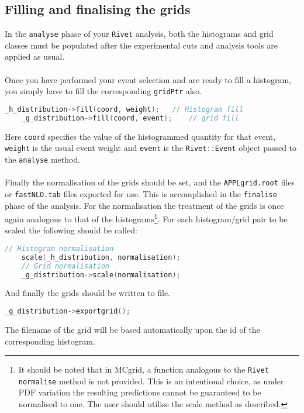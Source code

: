 \documentclass[11pt]{article}
\newcommand{\rivet} {{\tt Rivet}\xspace}
\newcommand{\appl} {{\tt APPLgrid}\xspace}
\newcommand{\fnlo} {{\tt fastNLO}\xspace}
\begin{document}
\subsection{Filling and finalising the grids}
In the \lstinline[language=c++]{analyse} phase of your \rivet analysis, both the histograms and grid classes must be populated after the experimental cuts and analysis tools are applied as usual.\\\\
Once you have performed your event selection and are ready to fill a histogram, you simply have to fill the corresponding \lstinline[language=c++]{gridPtr} also. 
   \begin{lstlisting}[language=c++]
	_h_distribution->fill(coord, weight);	// Histogram fill  
	_g_distribution->fill(coord, event);	// grid fill
\end{lstlisting}
Here \lstinline[language=c++]{coord} specifies the value of the histogrammed quantity for that event, \lstinline[language=c++]{weight} is the usual event weight and \lstinline[language=c++]{event} is the \lstinline[language=c++]{Rivet::Event} object passed to the \lstinline[language=c++]{analyse} method.
\\\\
Finally the normalisation of the grids should be set, and the \appl \lstinline[language=bash]{.root} files or \fnlo \lstinline[language=bash]{.tab} files exported for use. This is accomplished in the \lstinline[language=c++]{finalise} phase of the analysis. For the normalisation the treatment of the grids is once again analogous to that of the histograms\footnote{It should be noted that in MCgrid, a function analogous to the {\tt Rivet} \lstinline[language=c++]{normalise} method is not provided. This is an intentional choice, as under PDF variation the resulting predictions cannot be guaranteed to be normalised to one. The user should utilise the scale method as described.}. For each histogram/grid pair to be scaled the following should be called:
   \begin{lstlisting}[language=c++]
	// Histogram normalisation
	scale(_h_distribution, normalisation);	
	// Grid normalisation
	_g_distribution->scale(normalisation);	
\end{lstlisting}

And finally the grids should be written to file.   
\begin{lstlisting}[language=c++]
	_g_distribution->exportgrid();	
\end{lstlisting}
The filename of the grid will be based automatically upon the id of the corresponding histogram.
\end{document}
